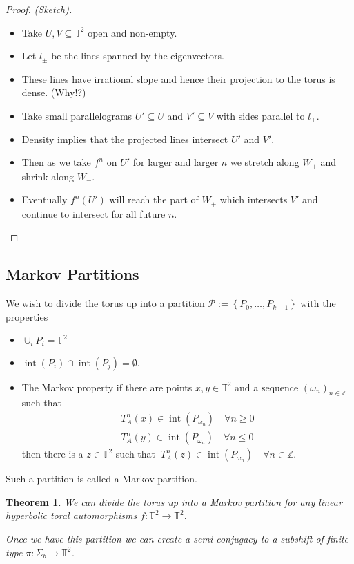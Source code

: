 \documentclass[11pt]{article}
\newcommand{\defeq}{:=}
\DeclareMathOperator{\intr}{\mathrm{int}}
\newcommand{\Z}{\mathbb{Z}}
\newcommand{\mdf}[1]{{\color{Green} #1}}
\newtheorem{theorem}{Theorem}[section]
\begin{document}
\begin{proof}
\textit{(Sketch).}
\begin{itemize}
	\item Take $U, V\subseteq \mathbb{T}^2$ open and non-empty.
	\item Let $l_\pm$ be the lines spanned by the eigenvectors. 
	\item These lines have irrational slope and hence their projection to the torus is dense. (Why!?)
	\item Take small parallelograms $U'\subseteq U$ and $V'\subseteq V$ with sides parallel to $l_\pm$.
	\item Density implies that the projected lines intersect $U'$ and $V'$.
	\item Then as we take $f^n$ on $U'$ for larger and larger $n$ we stretch along $W_+$ and shrink along $W_-$.
	\item Eventually $f^n(U')$ will reach the part of $W_+$ which intersects $V'$ and continue to intersect for all future $n$.
\end{itemize}
\end{proof}

\subsection{Markov Partitions}
We wish to divide the torus up into a partition $\mathcal{P}\defeq\left\{P_0, \dots, P_{k-1}\right\}$ with the properties
\begin{itemize}
	\item $\cup_i P_i = \mathbb{T}^2$
	\item $\intr(P_i)\cap \intr(P_j)=\emptyset$.
	\item The \mdf{Markov property} if there are points $x,y\in\mathbb{T}^2$ and a sequence $(\omega_n)_{n\in\Z}$ such that
		\begin{align*}
		T_A^n(x)\in\intr(P_{\omega_n})\quad \forall n\geq 0 \\
		T_A^n(y)\in\intr(P_{\omega_n})\quad \forall n\leq 0 
		\end{align*}
		then there is a $z\in\mathbb{T}^2$ such that $\:T_A^n(z)\in\intr(P_{\omega_n})\quad \forall n\in \Z$.
\end{itemize}
Such a partition is called a \mdf{Markov partition}.

\begin{theorem}
We can divide the torus up into a Markov partition for any linear hyperbolic toral automorphisms $f:\mathbb{T}^2\to\mathbb{T}^2$.

Once we have this partition we can create a semi conjugacy to a subshift of finite type $\pi:\Sigma_b\to\mathbb{T}^2$.
\end{theorem}
\end{document}
